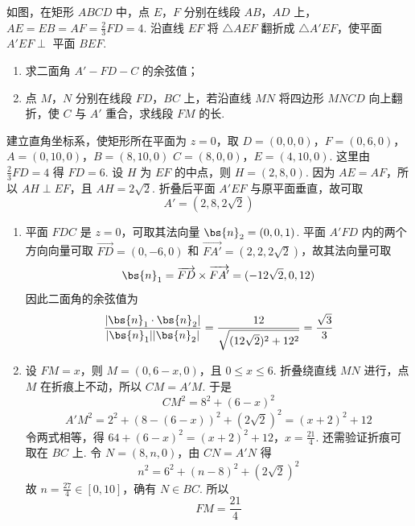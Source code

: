 \begin{problem}
如图，在矩形 \(ABCD\) 中，点 \(E\)，\(F\) 分别在线段 \(AB\)，\(AD\) 上，\(AE = EB = AF = \frac{2}{3} FD = 4\). 沿直线 \(EF\) 将 \(\triangle AEF\) 翻折成 \(\triangle A'EF\)，使平面 \(A'EF \perp\) 平面 \(BEF\).

\begin{enumerate}
\item 求二面角 \(A' - FD - C\) 的余弦值；
\item 点 \(M\)，\(N\) 分别在线段 \(FD\)，\(BC\) 上，若沿直线 \(MN\) 将四边形 \(MNCD\) 向上翻折，使 \(C\) 与 \(A'\) 重合，求线段 \(FM\) 的长.
\end{enumerate}


\begin{solution}
建立直角坐标系，使矩形所在平面为 \(z=0\)，取
\(D=(0,0,0)\)，\(F=(0,6,0)\)，\(A=(0,10,0)\)，\(B=(8,10,0)\)
\(C=(8,0,0)\)，\(E=(4,10,0)\).
这里由 \(\frac23FD=4\) 得 \(FD=6\). 设 \(H\) 为 \(EF\) 的中点，则 \(H=(2,8,0)\). 因为 \(AE=AF\)，所以 \(AH\perp EF\)，且 \(AH=2\sqrt2\). 折叠后平面 \(A'EF\) 与原平面垂直，故可取
\[
A'=(2,8,2\sqrt2)
\]

\begin{enumerate}
\item 平面 \(FDC\) 是 \(z=0\)，可取其法向量 \(\bs{n}_2=(0,0,1)\). 平面 \(A'FD\) 内的两个方向向量可取 \(\overrightarrow{FD}=(0,-6,0)\) 和 \(\overrightarrow{FA'}=(2,2,2\sqrt2)\)，故其法向量可取
\[
\bs{n}_1=\overrightarrow{FD}\times\overrightarrow{FA'}=(-12\sqrt2,0,12)
\]
因此二面角的余弦值为
\[
\frac{|\bs{n}_1\cdot\bs{n}_2|}{|\bs{n}_1||\bs{n}_2|}
=\frac{12}{\sqrt{(12\sqrt2)^2+12^2}}=\frac{\sqrt3}{3}
\]

\item 设 \(FM=x\)，则 \(M=(0,6-x,0)\)，且 \(0\leqslant x\leqslant6\). 折叠绕直线 \(MN\) 进行，点 \(M\) 在折痕上不动，所以 \(CM=A'M\). 于是
\[
CM^2=8^2+(6-x)^2
\]
\[
A'M^2=2^2+(8-(6-x))^2+(2\sqrt2)^2=(x+2)^2+12
\]
令两式相等，得
\(64+(6-x)^2=(x+2)^2+12\)，\(x=\frac{21}{4}\).
还需验证折痕可取在 \(BC\) 上. 令 \(N=(8,n,0)\)，由 \(CN=A'N\) 得
\[
n^2=6^2+(n-8)^2+(2\sqrt2)^2
\]
故 \(n=\frac{27}{4}\in[0,10]\)，确有 \(N\in BC\). 所以
\[
FM=\frac{21}{4}
\]
\end{enumerate}
\end{solution}
\end{problem}

